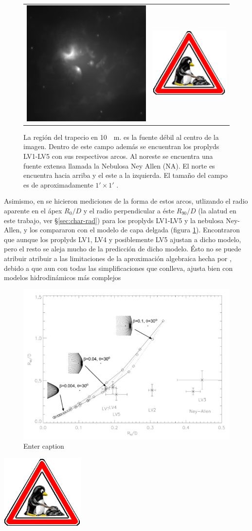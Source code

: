 \begin{figure}
  \begin{tabular}{lr}    \includegraphics[width=0.5\linewidth]{./Figures/Orion_Robberto}&\includegraphics[width=0.1\linewidth]{./Figures/tux-development}
  \end{tabular}
  \caption{La región del trapecio en \SI{10}{\mu m}. \thC{} es la fuente débil al centro de la imagen. Dentro de este campo además se encuentran los proplyds LV1-LV5 con sus respectivos arcos. Al noreste se encuentra una fuente extensa llamada la Nebulosa Ney Allen (NA). El norte es encuentra hacia arriba y el este a la izquierda. El tamaño del campo es de aproximadamente $1' \times 1'$ \citep{Robberto:2005}.}
\end{figure}

Asimismo, en \citet{Robberto:2005} se hicieron mediciones de la forma de estos arcos, utlizando el radio aparente en el ápex $R_0/D$ y el radio perpendicular a éste $R_{90}/D$ (la alatud en este trabajo, ver \S \ref{sec:char-rad}) para los proplyds LV1-LV5 y la nebulosa Ney-Allen, y los compararon con el modelo de capa delgada \citep{Canto:1996} (figura \ref{fig:Robberto}). Encontraron que aunque los proplyds LV1, LV4 y posiblemente LV5 ajustan a dicho modelo, pero el resto se aleja mucho de la predicción de dicho modelo. Ésto no se puede atribuir atribuir a las limitaciones de la aproximación algebraica hecha por \citet{Canto:1996}, debido a que aun con todas las simplificaciones que conlleva, ajusta bien con modelos hidrodinámicos más complejos

\begin{figure}
  \includegraphics[width=0.7\linewidth]{./Figures/robberto}
  \caption{Enter caption}
  \label{fig:Robberto}
\end{figure}

\includegraphics[width=0.1\linewidth]{./Figures/tux-development}
